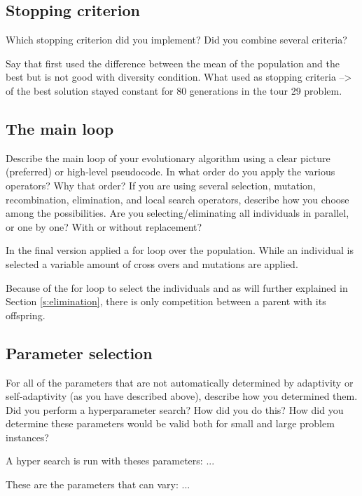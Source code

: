 \documentclass[a4paper,10pt]{article}
\newcommand{\ReplaceMe}[1]{{\color{blue}#1}}
\begin{document}
\subsection{Stopping criterion}

\ReplaceMe{Which stopping criterion did you implement? Did you combine several criteria?}

Say that first used the difference between the mean of the population and the best but is not good with diversity condition. What used as stopping criteria --> of the best solution stayed constant for 80 generations in the tour 29 problem. 

\subsection{The main loop}

\ReplaceMe{Describe the main loop of your evolutionary algorithm using a clear picture (preferred) or high-level pseudocode. In what order do you apply the various operators? Why that order? If you are using several selection, mutation, recombination, elimination, and local search operators, describe how you choose among the possibilities. Are you selecting/eliminating all individuals in parallel, or one by one? With or without replacement?}

In the final version applied a for loop over the population. While an individual is selected a variable amount of cross overs and mutations are applied. 

Because of the for loop to select the individuals and as will further explained in Section \ref{s:elimination}, there is only competition between a parent with its offspring. 



\subsection{Parameter selection}

\ReplaceMe{For all of the parameters that are not automatically determined by adaptivity or self-adaptivity (as you have described above), describe how you determined them. Did you perform a hyperparameter search? How did you do this? How did you determine these parameters would be valid both for small and large problem instances?}

A hyper search is run with theses parameters: ...

These are the parameters that can vary: ...
\end{document}
